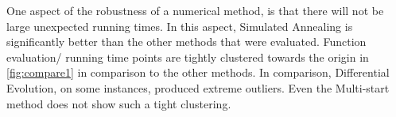 One aspect of the robustness of a numerical method, is that there will not be large unexpected running times. In this
aspect, Simulated Annealing is significantly better than the other methods that were evaluated. Function evaluation/
running time points are tightly clustered towards the origin in \cref{fig:compare1} in comparison to the other methods.
In comparison, Differential Evolution, on some instances, produced extreme outliers. Even the Multi-start method
does not show such a tight clustering.

